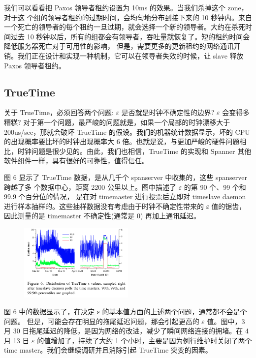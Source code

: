 \documentclass[letterpaper,twocolumn,10pt]{article}
\begin{document}
我们可以看看把 Paxos 领导者租约设置为 10ms 的效果。当我们杀掉这个 zone，对于这 个组的领导者租约的过期时间，会均匀地分布到接下来的 10 秒钟内。来自一个死亡的领导者的每个租约一旦过期，就会选择一个新的领导者。大约在杀死时间过去 10 秒钟以后，所有的组都会有领导者，吞吐量就恢复了。短的租约时间会降低服务器死亡对于可用性的影响， 但是，需要更多的更新租约的网络通讯开销。我们正在设计和实现一种机制，它可以在领导者失效的时候，让 slave 释放 Paxos 领导者租约。

\subsection{TrueTime}
关于 TrueTime，必须回答两个问题: $\varepsilon$ 是否就是时钟不确定性的边界? $\varepsilon$ 会变得多糟糕? 对于第一个问题，最严峻的问题就是，如果一个局部的时钟漂移大于 200us/sec，那就会破坏 TrueTime 的假设。我们的机器统计数据显示，坏的 CPU 的出现概率要比坏的时钟出现概率大 6 倍。也就是说，与更加严峻的硬件问题相比，时钟问题是很少见的。由此，我们也相信，TrueTime 的实现和 Spanner 其他软件组件一样，具有很好的可靠性，值得信任。

图 6 显示了 TrueTime 数据，是从几千个 spanserver 中收集的，这些 spanserver 跨越了多 个数据中心，距离 2200 公里以上。图中描述了 $\varepsilon$ 的第 90 个、99 个和 99.9 个百分位的情况， 是在对 timemaster 进行投票后立即对 timeslave daemon 进行样本抽样的。这些抽样数据没有考虑由于时钟不确定性带来的 ε 值的锯齿，因此测量的是 timemaster 不确定性(通常是 0) 再加上通讯延迟。

\begin{figure}[htbp]
\begin{center}
\includegraphics[width=0.5\textwidth]{./fig_6.png}
\label{Fig6}
\end{center}
\end{figure}

图 6 中的数据显示了，在决定 ε 的基本值方面的上述两个问题，通常都不会是个问题。 但是，可能会存在明显的拖尾延迟问题，那会引起更高的 $\varepsilon$ 值。图中，3 月 30 日拖尾延迟的降低，是因为网络的改进，减少了瞬间网络连接的拥堵。在 4 月 13 日 $\varepsilon$ 的值增加了，持续了大约 1 个小时，主要是因为例行维护时关闭了两个 time master。我们会继续调研并且消除引起 TrueTime 突变的因素。
\end{document}

